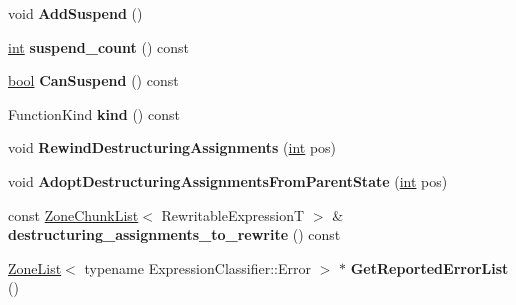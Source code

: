 \begin{DoxyCompactItemize}
void {\bfseries Add\+Suspend} ()
\item 
\mbox{\label{classv8_1_1internal_1_1ParserBase_1_1FunctionState_a3b43180d6b7f04c8f53e09d461557811}} 
\mbox{\hyperlink{classint}{int}} {\bfseries suspend\+\_\+count} () const
\item 
\mbox{\label{classv8_1_1internal_1_1ParserBase_1_1FunctionState_ad8127196e031a52b1014dfea6c39e125}} 
\mbox{\hyperlink{classbool}{bool}} {\bfseries Can\+Suspend} () const
\item 
\mbox{\label{classv8_1_1internal_1_1ParserBase_1_1FunctionState_acc1ef08daee8dcf9d750760498a39856}} 
Function\+Kind {\bfseries kind} () const
\item 
\mbox{\label{classv8_1_1internal_1_1ParserBase_1_1FunctionState_a8f8071f6345fd85745ae83b4a76f2c44}} 
void {\bfseries Rewind\+Destructuring\+Assignments} (\mbox{\hyperlink{classint}{int}} pos)
\item 
\mbox{\label{classv8_1_1internal_1_1ParserBase_1_1FunctionState_acc59b5f2f18ad9eb098a0e9acb9960cc}} 
void {\bfseries Adopt\+Destructuring\+Assignments\+From\+Parent\+State} (\mbox{\hyperlink{classint}{int}} pos)
\item 
\mbox{\label{classv8_1_1internal_1_1ParserBase_1_1FunctionState_a93b0d727351602e1455480dffc187ca3}} 
const \mbox{\hyperlink{classv8_1_1internal_1_1ZoneChunkList}{Zone\+Chunk\+List}}$<$ Rewritable\+ExpressionT $>$ \& {\bfseries destructuring\+\_\+assignments\+\_\+to\+\_\+rewrite} () const
\item 
\mbox{\label{classv8_1_1internal_1_1ParserBase_1_1FunctionState_a75d3e809cfbaba54eb4d7806c8329f66}} 
\mbox{\hyperlink{classv8_1_1internal_1_1ZoneList}{Zone\+List}}$<$ typename Expression\+Classifier\+::\+Error $>$ $\ast$ {\bfseries Get\+Reported\+Error\+List} ()
\item 
\mbox{\label{classv8_1_1internal_1_1ParserBase_1_1FunctionState_a60e62d3c8307a9fe5436a167e672d004}} 

\end{DoxyCompactItemize}
